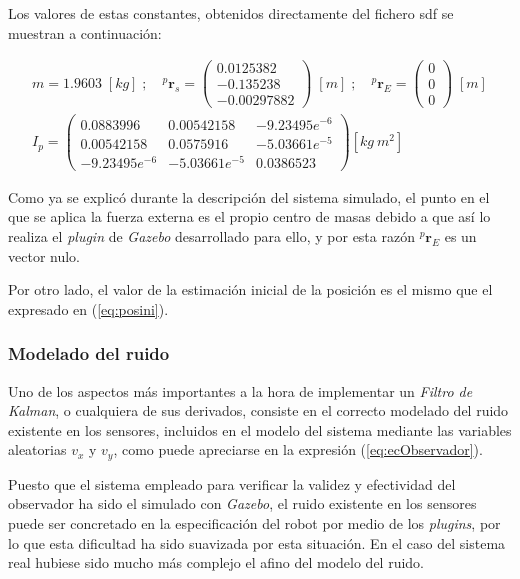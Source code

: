 Los valores de estas constantes, obtenidos directamente del fichero \acrshort{sdf} se muestran a continuación:

\[
\begin{split}
	m = 1.9603 \; [kg] \; ; \quad 
	^p\boldsymbol{r}_s = \begin{pmatrix}
		0.0125382 \\ -0.135238 \\ -0.00297882
	\end{pmatrix} \; [m] \; ; \quad 
	^p\boldsymbol{r}_E = \begin{pmatrix}
		0 \\ 0 \\ 0
	\end{pmatrix} \; [m] \\
	I_p = \begin{pmatrix}
		0.0883996 & 0.00542158 & -9.23495e^{-6} \\ 0.00542158 & 0.0575916 & -5.03661e^{-5} \\ -9.23495e^{-6} & -5.03661e^{-5} & 0.0386523
	\end{pmatrix} [kg \: m^2]
\end{split}
\]

Como ya se explicó durante la descripción del sistema simulado, el punto en el que se aplica la fuerza externa es el propio centro de masas debido a que así lo realiza el \emph{plugin} de \emph{Gazebo} desarrollado para ello, y por esta razón $^p\boldsymbol{r}_E$ es un vector nulo. \par 

Por otro lado, el valor de la estimación inicial de la posición es el mismo que el expresado en (\ref{eq:posini}).

\subsubsection{Modelado del ruido}

Uno de los aspectos más importantes a la hora de implementar un \emph{Filtro de Kalman}, o cualquiera de sus derivados, consiste en el correcto modelado del ruido existente en los sensores, incluidos en el modelo del sistema mediante las variables aleatorias $v_x$ y $v_y$, como puede apreciarse en la expresión (\ref{eq:ecObservador}). \par

Puesto que el sistema empleado para verificar la validez y efectividad del observador ha sido el simulado con \emph{Gazebo}, el ruido existente en los sensores puede ser concretado en la especificación del robot por medio de los \emph{plugins}, por lo que esta dificultad ha sido suavizada por esta situación. En el caso del sistema real hubiese sido mucho más complejo el afino del modelo del ruido. \par 

